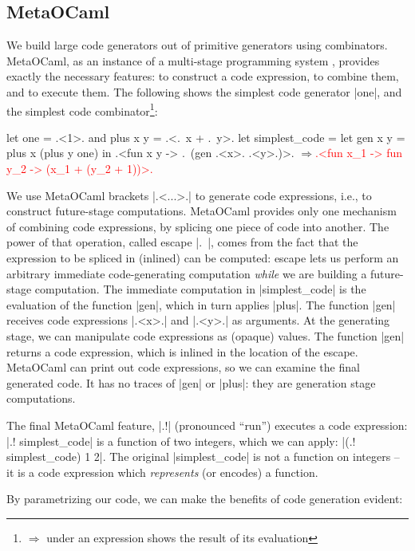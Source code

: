\documentclass{elsart}
\newcommand{\evalresult}[1]{\ensuremath{\Longrightarrow}\textcolor{red}{#1}}
\begin{document}
\subsection{MetaOCaml}

We build large code generators out of primitive generators using 
combinators. MetaOCaml, as an instance of a multi-stage
programming system \cite{TahaThesis}, provides exactly the necessary
features: to construct a code expression, to combine them, and to
execute them. The following shows the simplest code generator |one|,
and the simplest code combinator\footnote{%
$\Longrightarrow$ under an expression shows the result of its evaluation}:

\begin{code}[commandchars=\\\{\}]
let one = .<1>. and plus x y = .<.~x + .~y>.
let simplest_code = let gen x y = plus x (plus y one) in
  .<fun x y -> .~(gen .<x>. .<y>.)>.
\evalresult{.<fun x_1 -> fun y_2 -> (x_1 + (y_2 + 1))>.}
\end{code}

We use MetaOCaml brackets |.<...>.| to generate code expressions,
i.e., to construct future-stage computations. MetaOCaml provides only
one mechanism of combining code expressions, by splicing one
piece of code into
another. The power of that operation, called escape |.~|, comes from
the fact that the expression to be spliced in (inlined) can be
computed: escape lets us perform an arbitrary immediate code-generating
computation \emph{while} we are
building a future-stage computation. The immediate computation in
|simplest_code| is the evaluation of the function |gen|, which in turn
applies |plus|. The function |gen| receives code expressions |.<x>.|
and |.<y>.| as arguments. At the generating stage, we can manipulate
code expressions as (opaque) values. The function |gen| returns a code
expression, which is inlined in the location of the escape. MetaOCaml can
print out code expressions, so we can examine the final generated code. It
has no traces of |gen| or |plus|: they are generation stage computations.

The final MetaOCaml feature, |.!| (pronounced ``run'') 
executes a code expression: |.! simplest_code| is a function of two
integers, which we can apply: |(.! simplest_code) 1 2|. The original
|simplest_code| is not a function on integers -- it is a code
expression which \emph{represents} (or encodes) a function.

By parametrizing our code, we can make the benefits of code generation
evident:
\end{document}
